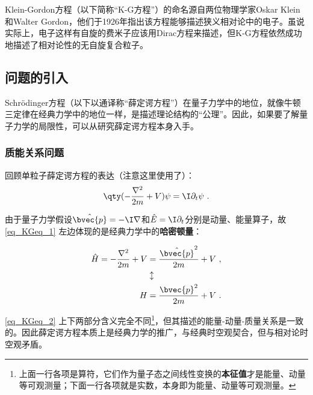 


Klein-Gordon方程（以下简称“K-G方程”）的命名源自两位物理学家Oskar Klein和Walter Gordon，他们于1926年指出该方程能够描述狭义相对论中的电子。虽说实际上，电子这样有自旋的费米子应该用Dirac方程来描述，但K-G方程依然成功地描述了相对论性的无自旋复合粒子。



\subsection{问题的引入}

Schrödinger方程（以下以通译称“薛定谔方程”）在量子力学中的地位，就像牛顿三定律在经典力学中的地位一样，是描述理论结构的“公理”。因此，如果要了解量子力学的局限性，可以从研究薛定谔方程本身入手。

\subsubsection{质能关系问题}

回顾单粒子薛定谔方程的表达（注意这里使用了）：
\begin{equation}\label{eq_KGeq_1}
\qty(-\frac{\nabla^2}{2m}+V)\psi = \I \partial_t \psi~.
\end{equation}

由于量子力学假设$\hat{\bvec{p}}=-\I\nabla$和$\hat{E}=\I\partial_t$分别是动量、能量算子，故\autoref{eq_KGeq_1} 左边体现的是经典力学中的\textbf{哈密顿量}：

\begin{equation}\label{eq_KGeq_2}
\begin{aligned}
\hat{H}=-\frac{\nabla^2}{2m}+V &= \frac{\hat{\bvec{p}}^2}{2m}+V ~,\\
&\updownarrow\\
H &= \frac{\bvec{p}^2}{2m}+V~.
\end{aligned}
\end{equation}

\autoref{eq_KGeq_2} 上下两部分含义完全不同\footnote{上面一行各项是算符，它们作为量子态之间线性变换的\textbf{本征值}才是能量、动量等可观测量；下面一行各项就是实数，本身即为能量、动量等可观测量。}，但其描述的能量-动量-质量关系是一致的。因此薛定谔方程本质上是经典力学的推广，与经典时空观契合，但与相对论时空观矛盾。

